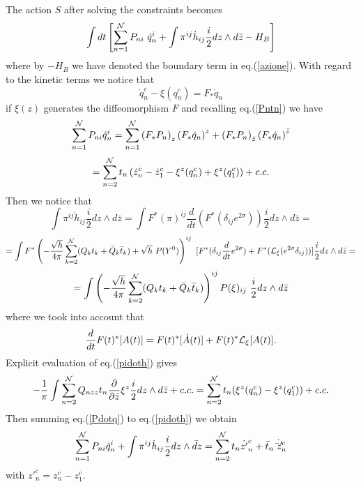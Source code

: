 \documentclass[a4paper,12pt]{article}
\begin{document}
The action $S$ after solving the constraints becomes
\begin{equation}
\int dt \left[\sum_{n=1}^{\cal N} P_{ni}~\dot q^i_n + \int
\pi^{ij}\dot h_{ij} \frac{i}{2}dz\wedge d\bar z -H_B\right] 
\end{equation}
where by $-H_B$ we have denoted the boundary term in
eq.(\ref{azione}). 
With regard to the kinetic terms we notice that 
\begin{equation}
\dot q^c_n-\xi(q^c_n) =F_*\dot q_n
\end{equation}
if $\xi(z)$ generates the diffeomorphism $F$ and recalling
eq.(\ref{Pntn}) we have
$$
\sum_{n=1}^{\cal N} P_{ni} \dot q^i_n = \sum_{n=1}^{\cal N}
\left(F_*P_n\right)_z  \left(F_* \dot q_n\right)^z
+\left(F_*P_n\right)_{\bar z}  \left(F_* \dot q_n\right)^{\bar z}
$$
\begin{equation}\label{Pdotq}
= \sum_{n=2}^{\cal N} t_n \left(\dot z^c_n -\dot z^c_1 - \xi^z(q^c_n)+
\xi^z(q^c_1)\right) + c.c. 
\end{equation}
Then we notice that
$$
\int \pi^{ij}\dot h_{ij} \frac{i}{2}dz\wedge d \bar z=\int
F^*(\pi)^{ij}\frac{d}{dt}(F^*(\delta_{ij}e^{2\sigma}))\frac{i}{2}dz\wedge
d \bar z= 
$$
$$
=\int F^*\left(-\frac{\sqrt{h}}{4\pi}\sum_{k=2}^{\cal
N}(Q_k t_k+\bar Q_k\bar t_k)
+\sqrt{h} ~P(Y^0)\right)^{ij}~[F^*(\delta_{ij}\frac{d}{dt}e^{2\sigma})
+F^*({\cal L}_{\xi}(e^{2\sigma}\delta_{ij}))]\frac{i}{2}dz\wedge d \bar z=    
$$
\begin{equation}\label{pidoth}
=\int \left(-\frac{\sqrt{h}}{4\pi}\sum_{k=2}^{\cal
N}(Q_k t_k+\bar Q_k\bar
t_k)\right)^{ij}P(\xi)_{ij}~\frac{i}{2}dz\wedge 
d \bar z
\end{equation}
where we took into account that
\begin{equation}
\frac{d}{dt}F(t)^*[A(t)]=F(t)^*[\dot A(t)]+F(t)^*{\cal L}_\xi [A(t)].
\end{equation}
Explicit evaluation of eq.(\ref{pidoth}) gives
\begin{equation}
-\frac{1}{\pi}\int\sum_{n=2}^{\cal N} Q_{nzz} t_n
 \frac{\partial}{\partial \bar z} \xi^z \frac{i}{2} dz\wedge d\bar
 z+c.c. = \sum_{n=2}^{\cal N} t_n(\xi^z(q^c_n)-\xi^z(q^c_1))+c.c.
\end{equation}
Then summing  eq.(\ref{Pdotq}) to eq.(\ref{pidoth}) we obtain
\begin{equation}
\sum_{n=1}^{\cal N} P_{ni}\dot q^i_n + \int \pi^{ij}\dot h_{ij}
\frac{i}{2}dz\wedge\bar dz = \sum_{n=2}^{\cal N} t_n \dot {z'}_n^c +
\bar t_n \dot {{\bar z}'}_n^c 
\end{equation}
with ${z'}^c_n={z}^c_n-{z}^c_1$.  
\end{document}
